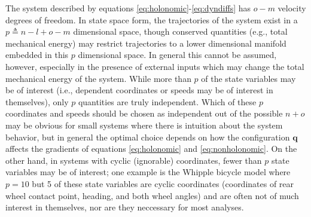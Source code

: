 \documentclass{svjour3}                     %
\begin{document}
The system described by equations \ref{eq:holonomic}-\ref{eq:dyndiffs} has
$o-m$ velocity degrees of freedom.  In state space form, the trajectories of
the system exist in a $p \triangleq n - l + o - m$ dimensional space, though
conserved quantities (e.g., total mechanical energy) may restrict trajectories
to a lower dimensional manifold embedded in this $p$ dimensional space.  In
general this cannot be assumed, however, especially in the presence of external
inputs which may change the total mechanical energy of the system.  While more
than $p$ of the state variables may be of interest (i.e., dependent coordinates
or speeds may be of interest in themselves), only $p$ quantities are truly
independent.  Which of these $p$ coordinates and speeds should be chosen as
independent out of the possible $n + o$ may be obvious for small systems where
there is intuition about the system behavior, but in general the optimal choice
depends on how the configuration $\bm{q}$ affects the gradients of equations
\ref{eq:holonomic} and \ref{eq:nonholonomic}.  On the other hand, in systems
with cyclic (ignorable) coordinates, fewer than $p$ state variables may be of
interest; one example is the Whipple bicycle model where $p=10$ but 5 of these
state variables are cyclic coordinates (coordinates of rear wheel contact
point, heading, and both wheel angles) and are often not of much interest in
themselves, nor are they neccessary for most analyses.
\end{document}
